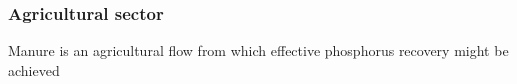 \documentclass[authoryear]{elsarticle}
\begin{document}
\subsubsection{Agricultural sector}
Manure is an agricultural flow from which effective phosphorus recovery might be achieved
%
\end{document}
